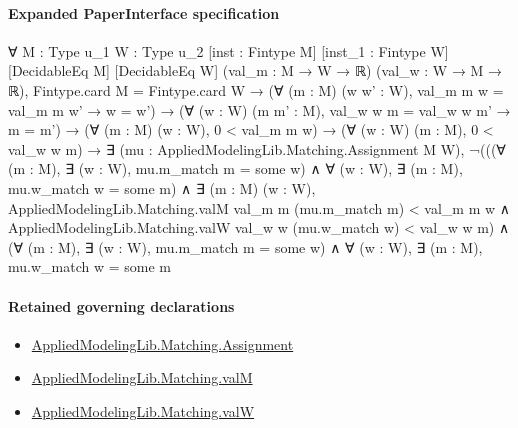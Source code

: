 \documentclass[10pt]{article}
\begin{document}
\paragraph{Expanded PaperInterface specification}
\begin{ReviewVerbatim}
∀ {M : Type u_1} {W : Type u_2} [inst : Fintype M] [inst_1 : Fintype W] [DecidableEq M] [DecidableEq W]
  (val_m : M → W → ℝ) (val_w : W → M → ℝ),
  Fintype.card M = Fintype.card W →
    (∀ (m : M) (w w' : W), val_m m w = val_m m w' → w = w') →
      (∀ (w : W) (m m' : M), val_w w m = val_w w m' → m = m') →
        (∀ (m : M) (w : W), 0 < val_m m w) →
          (∀ (w : W) (m : M), 0 < val_w w m) →
            ∃ (mu : AppliedModelingLib.Matching.Assignment M W),
              ¬(((∀ (m : M), ∃ (w : W), mu.m_match m = some w) ∧ ∀ (w : W), ∃ (m : M), mu.w_match w = some m) ∧
                    ∃ (m : M) (w : W),
                      AppliedModelingLib.Matching.valM val_m m (mu.m_match m) < val_m m w ∧
                        AppliedModelingLib.Matching.valW val_w w (mu.w_match w) < val_w w m) ∧
                (∀ (m : M), ∃ (w : W), mu.m_match m = some w) ∧ ∀ (w : W), ∃ (m : M), mu.w_match w = some m
\end{ReviewVerbatim}

\paragraph{Retained governing declarations}
\begin{itemize}\raggedright
\item \hyperlink{governing-declaration-508c084086b006b8}{Applied\allowbreak{}Modeling\allowbreak{}Lib.\allowbreak{}Matching.\allowbreak{}Assignment}
\item \hyperlink{governing-declaration-3963208d135cca00}{Applied\allowbreak{}Modeling\allowbreak{}Lib.\allowbreak{}Matching.\allowbreak{}val\allowbreak{}M}
\item \hyperlink{governing-declaration-85f87c1f3ae178ac}{Applied\allowbreak{}Modeling\allowbreak{}Lib.\allowbreak{}Matching.\allowbreak{}val\allowbreak{}W}
\end{itemize}
\end{document}
